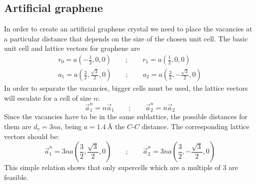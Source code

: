 \subsection{Artificial graphene}
In order to create an artificial graphene crystal we need to place the vacancies at a particular distance that depends on the size of the chosen unit cell.
The basic unit cell and lattice vectors for graphene are
\begin{equation}
\begin{split}
  r_0 = a\left(-\frac{1}{2},0,0\right) \qquad ; \qquad
  r_1 = a\left(\frac{1}{2},0,0\right)\\
  a_1 = a\left(\frac{3}{2},\frac{\sqrt{3}}{2},0\right) \qquad ; \qquad
  a_2 = a\left(\frac{3}{2},-\frac{\sqrt{3}}{2},0\right)
\end{split}
\end{equation}
In order to separate the vacancies, bigger cells must be used, the lattice vectors will escalate for a cell of size $n$:
\begin{equation}
  \vec{a}^n_1 = n \vec{a}_1 \qquad ; \qquad \vec{a}^n_2 = n \vec{a}_2
\end{equation}
Since the vacancies have to be in the same sublattice, the possible distances for them are $d_v = 3na$, being $a=\SI{1.4}{\angstrom}$ the $C$-$C$ distance. The corresponding lattice vectors should be:
\begin{equation}
  \vec{a}^n_1 = 3na\left(\frac{3}{2},\frac{\sqrt{3}}{2},0\right) \qquad ; \qquad
  \vec{a}^n_2 = 3na\left(\frac{3}{2},-\frac{\sqrt{3}}{2},0\right)
\end{equation}
This simple relation shows that only supercells which are a multiple of 3 are feasible.



